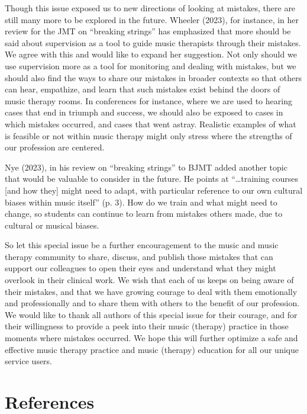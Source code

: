 \documentclass[authordate, empirical, issue]{jote-new-article}
\begin{document}
Though this issue exposed us to new directions of looking at mistakes, there are still many more to be explored in the future. Wheeler (2023), for instance, in her review for the JMT on “breaking strings” has emphasized that more should be said about supervision as a tool to guide music therapists through their mistakes. We agree with this and would like to expand her suggestion. Not only should we use supervision more as a tool for monitoring and dealing with mistakes, but we should also find the ways to share our mistakes in broader contexts so that others can hear, empathize, and learn that such mistakes exist behind the doors of music therapy rooms. In conferences for instance, where we are used to hearing cases that end in triumph and success, we should also be exposed to cases in which mistakes occurred, and cases that went astray. Realistic examples of what is feasible or not within music therapy might only stress where the strengths of our profession are centered.



Nye (2023), in his review on “breaking strings” to BJMT added another topic that would be valuable to consider in the future. He points at “…training courses [and how they] might need to adapt, with particular reference to our own cultural biases within music itself” (p. 3). How do we train and what might need to change, so students can continue to learn from mistakes others made, due to cultural or musical biases.



So let this special issue be a further encouragement to the music and music therapy community to share, discuss, and publish those mistakes that can support our colleagues to open their eyes and understand what they might overlook in their clinical work. We wish that each of us keeps on being aware of their mistakes, and that we have growing courage to deal with them emotionally and professionally and to share them with others to the benefit of our profession. We would like to thank all authors of this special issue for their courage, and for their willingness to provide a peek into their music (therapy) practice in those moments where mistakes occurred. We hope this will further optimize a safe and effective music therapy practice and music (therapy) education for all our unique service users.

\newpage
\section{References}
\end{document}
